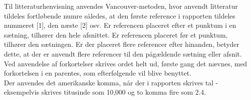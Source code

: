 Til litteraturhenvisning anvendes Vancouver-metoden, hvor anvendt litteratur tildeles fortløbende numre således, at den første reference i rapporten tildeles nummeret [1], den næste [2] osv. Er referencen placeret efter et punktum i en sætning, tilhører den hele afsnittet. Er referencen placeret før et punktum, tilhører den sætningen. Er der placeret flere referencer efter hinanden, betyder dette, at der er anvendt flere referencer til den pågældende sætning eller afsnit. \\
Ved anvendelse af forkortelser skrives ordet helt ud, første gang det nævnes, med forkortelsen i en parentes, som efterfølgende vil blive benyttet. \\
Der anvendes det amerikanske komma, når der i rapporten skrives tal - eksempelvis skrives titusinde som 10,000 og to komma fire som 2.4.%

